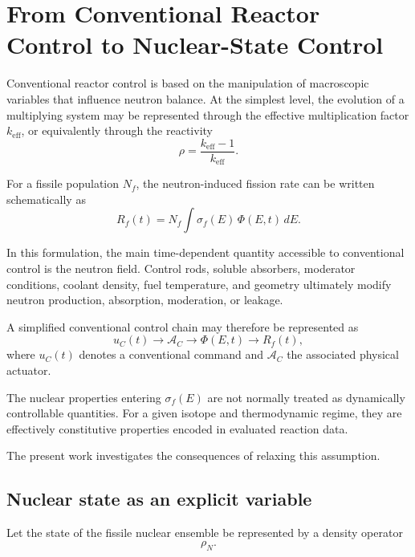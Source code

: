 \section{From Conventional Reactor Control to Nuclear-State Control}
\label{sec:control_framework}

Conventional reactor control is based on the manipulation of macroscopic variables that influence neutron balance. At the simplest level, the evolution of a multiplying system may be represented through the effective multiplication factor $k_{\mathrm{eff}}$, or equivalently through the reactivity
\begin{equation}
\rho
=
\frac{k_{\mathrm{eff}}-1}{k_{\mathrm{eff}}}.
\end{equation}

For a fissile population $N_f$, the neutron-induced fission rate can be written schematically as
\begin{equation}
R_f(t)
=
N_f
\int
\sigma_f(E)\,
\Phi(E,t)\,
dE.
\label{eq:fission_rate_control}
\end{equation}

In this formulation, the main time-dependent quantity accessible to conventional control is the neutron field. Control rods, soluble absorbers, moderator conditions, coolant density, fuel temperature, and geometry ultimately modify neutron production, absorption, moderation, or leakage.

A simplified conventional control chain may therefore be represented as
\begin{equation}
u_C(t)
\longrightarrow
\mathcal{A}_C
\longrightarrow
\Phi(E,t)
\longrightarrow
R_f(t),
\end{equation}
where $u_C(t)$ denotes a conventional command and $\mathcal{A}_C$ the associated physical actuator.

The nuclear properties entering $\sigma_f(E)$ are not normally treated as dynamically controllable quantities. For a given isotope and thermodynamic regime, they are effectively constitutive properties encoded in evaluated reaction data.

The present work investigates the consequences of relaxing this assumption.

\subsection{Nuclear state as an explicit variable}

Let the state of the fissile nuclear ensemble be represented by a density operator
\begin{equation}
\rho_N.
\end{equation}


